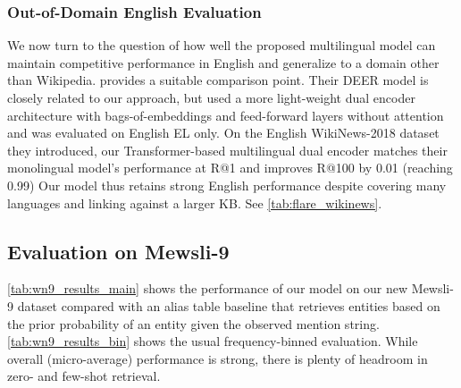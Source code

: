 \documentclass[11pt,a4paper]{article}
\begin{document}
\subsubsection{Out-of-Domain English Evaluation}\label{sec:eval_english}
We now turn to the question of how well the proposed multilingual model can maintain competitive performance in English and generalize to a domain other than Wikipedia.
 provides a suitable comparison point.
Their DEER model is closely related to our approach, but used a more light-weight dual encoder architecture with bags-of-embeddings and feed-forward layers without attention and was evaluated on English EL only.
On the English WikiNews-2018 dataset they introduced, our Transformer-based multilingual dual encoder matches their monolingual model's performance at R@1 and improves R@100 by 0.01 (reaching 0.99)
Our model thus retains strong English performance despite covering many languages and linking against a larger KB. See \autoref{tab:flare_wikinews}.

\subsection{Evaluation on Mewsli-9}\label{sec:eval_wikinews9}
\autoref{tab:wn9_results_main} shows the performance of our model on our new Mewsli-9 dataset compared with an alias table baseline that retrieves entities based on the prior probability of an entity given the observed mention string.
\autoref{tab:wn9_results_bin} shows the usual frequency-binned evaluation. While overall (micro-average) performance is strong, there is plenty of headroom in zero- and few-shot retrieval.
\end{document}
